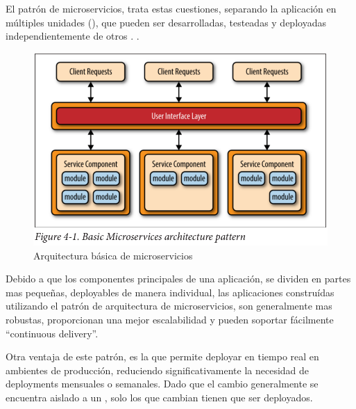 El patrón de microservicios, trata estas cuestiones, separando la aplicación en múltiples unidades  (), que pueden ser desarrolladas, testeadas y deployadas independientemente de otros . .\cite[p.~27]{richards2015}

\begin{figure}
  \includegraphics[width=\linewidth]{src/images/02-capitulo-2/basic_microservices_arquitecture_pattern.png}
  \caption{Arquitectura básica de microservicios}
  \label{fig:basic_microservices_arquitecture_pattern}
\end{figure}

Debido a que los componentes principales de una aplicación, se dividen en partes mas pequeñas, deployables de manera individual, las aplicaciones construídas utilizando el patrón de arquitectura de microservicios, son generalmente mas robustas, proporcionan una mejor escalabilidad y pueden soportar fácilmente ``continuous delivery''.

Otra ventaja de este patrón, es la que permite deployar en tiempo real en ambientes de producción, reduciendo significativamente la necesidad de deployments mensuales o semanales.  Dado que el cambio generalmente se encuentra aislado a un , solo los  que cambian tienen que ser deployados.
